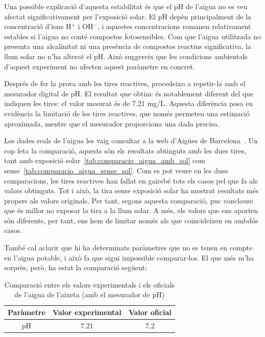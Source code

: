Una possible explicació d’aquesta estabilitat és que el pH de l’aigua no es veu afectat significativament per l’exposició solar. El pH depèn principalment de la concentració d’ions H$^+$ i OH$^-$, i aquestes concentracions romanen relativament estables si l’aigua no conté compostos fotosensibles. Com que l’aigua utilitzada no presenta una alcalinitat ni una presència de compostos reactius significativa, la llum solar no n’ha alterat el pH. Això suggereix que les condicions ambientals d’aquest experiment no afecten aquest paràmetre en concret.

Després de fer la prova amb les tires reactives, procedeixo a repetir-la amb el mesurador digital de pH. El resultat que obtinc és notablement diferent del que indiquen les tires: el valor mesurat és de 7.21 mg/L. Aquesta diferència posa en evidència la limitació de les tires reactives, que només permeten una estimació aproximada, mentre que el mesurador proporciona una dada precisa.

Les dades reals de l’aigua les vaig consultar a la web d’Aigües de Barcelona~\cite{qualitatAigua}. Un cop feta la comparació, aquests són els resultats obtinguts amb les dues tires, tant amb exposició solar~\ref{tab:comparacio_aigua_amb_sol} com sense~\ref{tab:comparacio_aigua_sense_sol}.
Com es pot veure en les dues comparacions, les tires reactives han fallat en gairebé tots els casos pel que fa als valors obtinguts. Tot i això, la tira sense exposició solar ha mostrat resultats més propers als valors originals. Per tant, segons aquesta comparació, puc concloure que és millor no exposar la tira a la llum solar. A més, els valors que ens aporten són diferents, per tant, ens hem de limitar només als que coincideixen en ambdós casos.

També cal aclarir que hi ha determinats paràmetres que no es tenen en compte en l’aigua potable, i això fa que sigui impossible comparar-los. El que més m’ha sorprès, però, ha estat la comparació següent:

\begin{minipage}[h]{1\textwidth}
  \begin{table}[H]
  \centering
  \begin{tabular}{|c|c|c|}
  \hline
  \textbf{Paràmetre} & \textbf{Valor experimental} & \textbf{Valor oficial} \\
  \hline \hline
  pH & 7.21 & 7,2 \\
  \hline
  \end{tabular}
  \caption{Comparació entre els valors experimentals i els oficials de l'aigua de l'aixeta (amb el mesurador de pH)}
  \label{tab:comparacio_mesurador_ph1}
\end{table}
\end{minipage}
\clearpage


